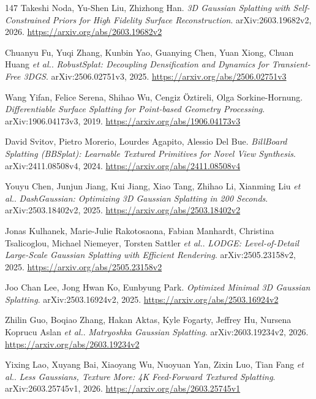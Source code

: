 \documentclass[11pt,a4paper]{article}
\begin{document}
\begin{thebibliography}{147}
Takeshi Noda, Yu-Shen Liu, Zhizhong Han.
\newblock \emph{3D Gaussian Splatting with Self-Constrained Priors for High Fidelity Surface Reconstruction}.
\newblock arXiv:2603.19682v2, 2026.
\newblock \url{https://arxiv.org/abs/2603.19682v2}

Chuanyu Fu, Yuqi Zhang, Kunbin Yao, Guanying Chen, Yuan Xiong, Chuan Huang \emph{et al.}.
\newblock \emph{RobustSplat: Decoupling Densification and Dynamics for Transient-Free 3DGS}.
\newblock arXiv:2506.02751v3, 2025.
\newblock \url{https://arxiv.org/abs/2506.02751v3}

Wang Yifan, Felice Serena, Shihao Wu, Cengiz \"{O}ztireli, Olga Sorkine-Hornung.
\newblock \emph{Differentiable Surface Splatting for Point-based Geometry Processing}.
\newblock arXiv:1906.04173v3, 2019.
\newblock \url{https://arxiv.org/abs/1906.04173v3}

David Svitov, Pietro Morerio, Lourdes Agapito, Alessio Del Bue.
\newblock \emph{BillBoard Splatting (BBSplat): Learnable Textured Primitives for Novel View Synthesis}.
\newblock arXiv:2411.08508v4, 2024.
\newblock \url{https://arxiv.org/abs/2411.08508v4}

Youyu Chen, Junjun Jiang, Kui Jiang, Xiao Tang, Zhihao Li, Xianming Liu \emph{et al.}.
\newblock \emph{DashGaussian: Optimizing 3D Gaussian Splatting in 200 Seconds}.
\newblock arXiv:2503.18402v2, 2025.
\newblock \url{https://arxiv.org/abs/2503.18402v2}

Jonas Kulhanek, Marie-Julie Rakotosaona, Fabian Manhardt, Christina Tsalicoglou, Michael Niemeyer, Torsten Sattler \emph{et al.}.
\newblock \emph{LODGE: Level-of-Detail Large-Scale Gaussian Splatting with Efficient Rendering}.
\newblock arXiv:2505.23158v2, 2025.
\newblock \url{https://arxiv.org/abs/2505.23158v2}

Joo Chan Lee, Jong Hwan Ko, Eunbyung Park.
\newblock \emph{Optimized Minimal 3D Gaussian Splatting}.
\newblock arXiv:2503.16924v2, 2025.
\newblock \url{https://arxiv.org/abs/2503.16924v2}

Zhilin Guo, Boqiao Zhang, Hakan Aktas, Kyle Fogarty, Jeffrey Hu, Nursena Koprucu Aslan \emph{et al.}.
\newblock \emph{Matryoshka Gaussian Splatting}.
\newblock arXiv:2603.19234v2, 2026.
\newblock \url{https://arxiv.org/abs/2603.19234v2}

Yixing Lao, Xuyang Bai, Xiaoyang Wu, Nuoyuan Yan, Zixin Luo, Tian Fang \emph{et al.}.
\newblock \emph{Less Gaussians, Texture More: 4K Feed-Forward Textured Splatting}.
\newblock arXiv:2603.25745v1, 2026.
\newblock \url{https://arxiv.org/abs/2603.25745v1}


\end{thebibliography}
\end{document}
